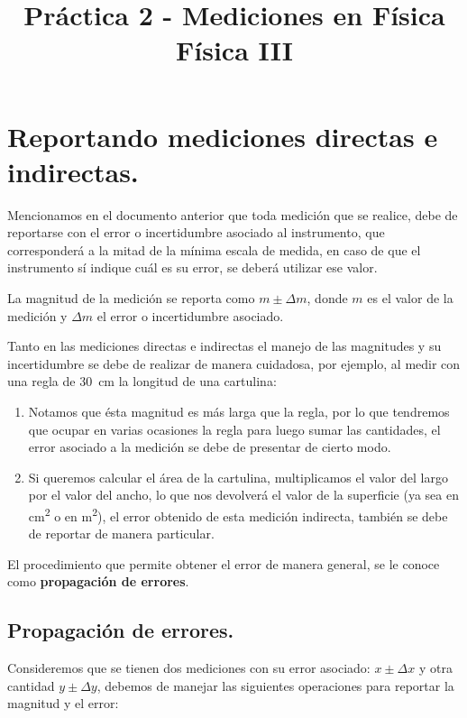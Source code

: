 \documentclass[14pt]{extarticle}
\title{\vspace*{-2cm} Práctica 2 - Mediciones en Física \\  Física III \vspace{-5ex}}
\date{}
\begin{document}
\maketitle

\section{Reportando mediciones directas e indirectas. }

Mencionamos en el documento anterior que toda medición que se realice, debe de reportarse con el error o incertidumbre asociado al instrumento, que corresponderá a la mitad de la mínima escala de medida, en caso de que el instrumento sí indique cuál es su error, se deberá utilizar ese valor.

La magnitud de la medición se reporta como $m \pm \Delta m$, donde $m$ es el valor de la medición y $\Delta m$ el error o incertidumbre asociado.

Tanto en las mediciones directas e indirectas el manejo de las magnitudes y su incertidumbre se debe de realizar de manera cuidadosa, por ejemplo, al medir con una regla de \SI{30}{\centi\meter} la longitud de una cartulina:
\begin{enumerate}[label=\alph*)]
\item Notamos que ésta magnitud es más larga que la regla, por lo que tendremos que ocupar en varias ocasiones la regla para luego sumar las cantidades, el error asociado a la medición se debe de presentar de cierto modo. 
\item Si queremos calcular el área de la cartulina, multiplicamos el valor del largo por el valor del ancho, lo que nos devolverá el valor de la superficie (ya sea en \unit{\square\centi\meter} o en \unit{\square\meter}), el error obtenido de esta medición indirecta, también se debe de reportar de manera particular.
\end{enumerate}
El procedimiento que permite obtener el error de manera general, se le conoce como \textbf{propagación de errores}.

\subsection{Propagación de errores.}

Consideremos que se tienen dos mediciones con su error asociado: $x \pm \Delta x$ y otra cantidad $y \pm \Delta y$, debemos de manejar las siguientes operaciones para reportar la magnitud y el error:
\end{document}
